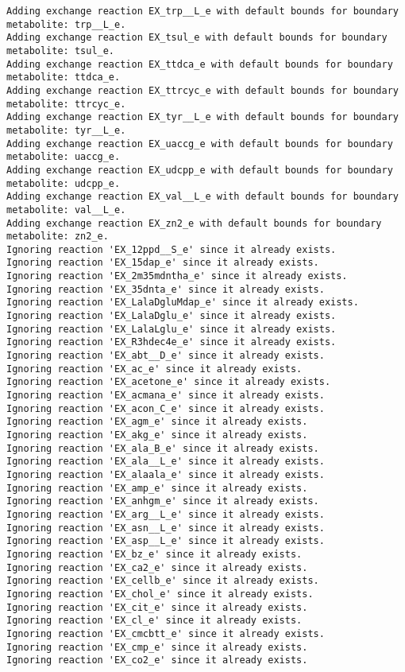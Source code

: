 \documentclass[
  letterpaper,
  DIV=11,
  numbers=noendperiod]{scrartcl}
\begin{document}
\begin{verbatim}
Adding exchange reaction EX_trp__L_e with default bounds for boundary metabolite: trp__L_e.
Adding exchange reaction EX_tsul_e with default bounds for boundary metabolite: tsul_e.
Adding exchange reaction EX_ttdca_e with default bounds for boundary metabolite: ttdca_e.
Adding exchange reaction EX_ttrcyc_e with default bounds for boundary metabolite: ttrcyc_e.
Adding exchange reaction EX_tyr__L_e with default bounds for boundary metabolite: tyr__L_e.
Adding exchange reaction EX_uaccg_e with default bounds for boundary metabolite: uaccg_e.
Adding exchange reaction EX_udcpp_e with default bounds for boundary metabolite: udcpp_e.
Adding exchange reaction EX_val__L_e with default bounds for boundary metabolite: val__L_e.
Adding exchange reaction EX_zn2_e with default bounds for boundary metabolite: zn2_e.
Ignoring reaction 'EX_12ppd__S_e' since it already exists.
Ignoring reaction 'EX_15dap_e' since it already exists.
Ignoring reaction 'EX_2m35mdntha_e' since it already exists.
Ignoring reaction 'EX_35dnta_e' since it already exists.
Ignoring reaction 'EX_LalaDgluMdap_e' since it already exists.
Ignoring reaction 'EX_LalaDglu_e' since it already exists.
Ignoring reaction 'EX_LalaLglu_e' since it already exists.
Ignoring reaction 'EX_R3hdec4e_e' since it already exists.
Ignoring reaction 'EX_abt__D_e' since it already exists.
Ignoring reaction 'EX_ac_e' since it already exists.
Ignoring reaction 'EX_acetone_e' since it already exists.
Ignoring reaction 'EX_acmana_e' since it already exists.
Ignoring reaction 'EX_acon_C_e' since it already exists.
Ignoring reaction 'EX_agm_e' since it already exists.
Ignoring reaction 'EX_akg_e' since it already exists.
Ignoring reaction 'EX_ala_B_e' since it already exists.
Ignoring reaction 'EX_ala__L_e' since it already exists.
Ignoring reaction 'EX_alaala_e' since it already exists.
Ignoring reaction 'EX_amp_e' since it already exists.
Ignoring reaction 'EX_anhgm_e' since it already exists.
Ignoring reaction 'EX_arg__L_e' since it already exists.
Ignoring reaction 'EX_asn__L_e' since it already exists.
Ignoring reaction 'EX_asp__L_e' since it already exists.
Ignoring reaction 'EX_bz_e' since it already exists.
Ignoring reaction 'EX_ca2_e' since it already exists.
Ignoring reaction 'EX_cellb_e' since it already exists.
Ignoring reaction 'EX_chol_e' since it already exists.
Ignoring reaction 'EX_cit_e' since it already exists.
Ignoring reaction 'EX_cl_e' since it already exists.
Ignoring reaction 'EX_cmcbtt_e' since it already exists.
Ignoring reaction 'EX_cmp_e' since it already exists.
Ignoring reaction 'EX_co2_e' since it already exists.

\end{verbatim}
\end{document}
